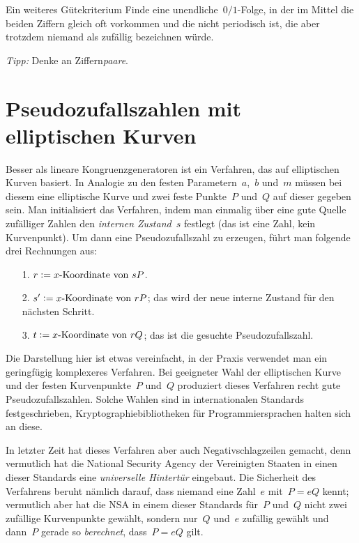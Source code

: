 \documentclass{../zirkelblatt}
\newcommand{\head}[1]{\section*{\rmfamily #1}}%
\newcommand{\defeq}{\vcentcolon=}
\begin{document}
\begin{aufgabeShaded}{Ein weiteres Gütekriterium}
Finde eine unendliche~$0/1$-Folge, in der im Mittel die beiden Ziffern gleich
oft vorkommen und die nicht periodisch ist, die aber trotzdem niemand als
zufällig bezeichnen würde.

\emph{Tipp:} Denke an Ziffern\emph{paare}.
\end{aufgabeShaded}


\head{Pseudozufallszahlen mit elliptischen Kurven}

Besser als lineare Kongruenzgeneratoren ist ein Verfahren, das auf elliptischen
Kurven basiert. In Analogie zu den festen Parametern~$a$,~$b$ und~$m$ müssen bei
diesem eine elliptische Kurve und zwei feste Punkte~$P$ und~$Q$ auf dieser
gegeben sein. Man initialisiert das Verfahren, indem man einmalig über eine
gute Quelle zufälliger Zahlen den \emph{internen Zustand~$s$} festlegt (das ist
eine Zahl, kein Kurvenpunkt). Um dann eine Pseudozufallszahl zu erzeugen,
führt man folgende drei Rechnungen aus:

\begin{enumerate}
\item[1.] $r \defeq \text{$x$-Koordinate von~$sP$}$.
\item[2.] $s' \defeq \text{$x$-Koordinate von~$rP$}$; das wird der neue interne Zustand
für den nächsten Schritt.
\item[3.] $t \defeq \text{$x$-Koordinate von~$rQ$}$; das ist die gesuchte
Pseudozufallszahl.
\end{enumerate}

Die Darstellung hier ist etwas vereinfacht, in der Praxis verwendet man ein
geringfügig komplexeres Verfahren. Bei geeigneter Wahl der
elliptischen Kurve und der festen Kurvenpunkte~$P$ und~$Q$ produziert dieses
Verfahren recht gute Pseudozufallszahlen. Solche Wahlen sind in internationalen
Standards festgeschrieben, Kryptographiebibliotheken für Programmiersprachen
halten sich an diese.

In letzter Zeit hat dieses Verfahren aber auch Negativschlagzeilen gemacht,
denn vermutlich hat die National Security Agency der Vereinigten Staaten in
einen dieser Standards eine \emph{universelle Hintertür} eingebaut. Die
Sicherheit des Verfahrens beruht nämlich darauf, dass niemand eine Zahl~$e$
mit~$P = eQ$ kennt; vermutlich aber hat die NSA in einem dieser Standards
für~$P$ und~$Q$ nicht zwei zufällige Kurvenpunkte gewählt, sondern nur~$Q$
und~$e$ zufällig gewählt und dann~$P$ gerade so \emph{berechnet}, dass~$P = eQ$
gilt.
\end{document}

